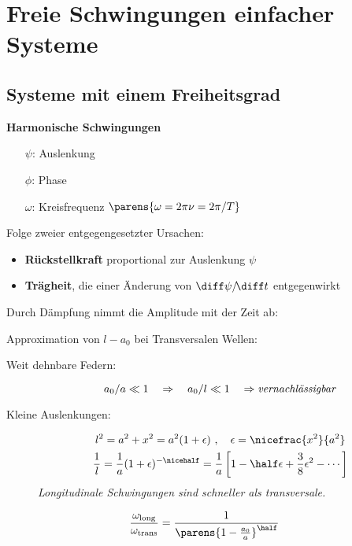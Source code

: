 
\section{Freie Schwingungen einfacher Systeme} %
	\subsection{Systeme mit einem Freiheitsgrad} %
		\textbf{Harmonische Schwingungen}
		\begin{itemize}
			\item[$\psi$:] Auslenkung
			\item[$\phi$:] Phase
			\item[$\omega$:] Kreisfrequenz $\parens{\omega = 2\pi\nu = 2\pi/T}$
		\end{itemize}
		
		Folge zweier entgegengesetzter Ursachen:
		\begin{itemize}
			\item \textbf{Rückstellkraft} proportional zur Auslenkung $\psi$
			\item \textbf{Trägheit}, die einer Änderung von $\diff \psi/\!\diff t$ entgegenwirkt
		\end{itemize}
		
		Durch Dämpfung nimmt die Amplitude mit der Zeit ab:
		
		Approximation von $l - a_0$ bei Transversalen Wellen:
		\begin{description}
			\item[Weit dehnbare Federn:] \[
				a_0/a \ll 1 \quad \Rightarrow \quad a_0/l \ll 1 \quad \Rightarrow \text{\emph{vernachlässigbar}}
			\]
			\item[Kleine Auslenkungen:] \begin{gather*}
				l^2 = a^2 + x^2 = a^2(1+\epsilon)\ ,\quad \epsilon = \nicefrac{x^2}{a^2} \\
				\frac{1}{l} = \frac{1}{a}(1+\epsilon)^{-\nicehalf} = \frac{1}{a}\left[
					1 - \half\epsilon + \frac 3 8 \epsilon^2 - \cdots
				\right]
			\end{gather*}
			\emph{Longitudinale Schwingungen sind schneller als transversale.}
		\end{description}
		\[
			\frac{\omega_\text{long}}{\omega_\text{trans}} = \frac{1}{\parens{1-\frac{a_0}{a}}^\half}
		\]
	
